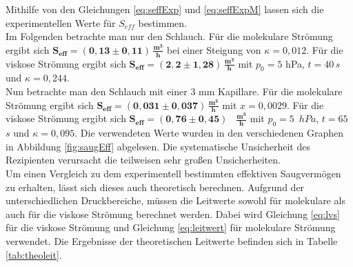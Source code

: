 \documentclass[a4paper,usenatbib]{aspdoc}
\begin{document}
            Mithilfe von den Gleichungen \ref{eq:seffExp} und \ref{eq:seffExpM} lassen sich die experimentellen Werte für $S_{eff}$ bestimmen. 
            \\
            Im Folgenden betrachte man nur den Schlauch. Für die molekulare Strömung ergibt sich $\mathbf{S_{eff} = (0,13 \pm 0,11)}$\,$\mathbf{ \frac{m^3}{h}}$ bei einer Steigung von $\kappa = 0,012$. Für die viskose Strömung ergibt sich $\mathbf{S_{eff} = (2,2 \pm 1,28)}$\,$\mathbf{ \frac{m^3}{h}}$ mit $p_0 = 5$ hPa, $t = 40$\,$s$ und $\kappa = 0,244$.\\
            Nun betrachte man den Schlauch mit einer 3 mm Kapillare. Für die molekulare Strömung ergibt sich $\mathbf{S_{eff} = (0,031 \pm 0,037)}$\,$\mathbf{\frac{m^3}{h}}$ mit $x = 0,0029$. Für die viskose Strömung ergibt sich $\mathbf{S_{eff} = (0,76 \pm 0,45)}$ \, $\mathbf{ \frac{m^3}{h}}$ mit $p_0 = 5$\, $hPa$, $t = 65$\,$s$ und $\kappa = 0,095$.
            Die verwendeten Werte wurden in den verschiedenen Graphen in Abbildung \ref{fig:saugEff} abgelesen. Die systematische Unsicherheit des Rezipienten verursacht die teilweisen sehr großen Unsicherheiten. 
            \\
            Um einen Vergleich zu dem experimentell bestimmten effektiven Saugvermögen zu erhalten, lässt sich dieses auch theoretisch berechnen. Aufgrund der unterschiedlichen Druckbereiche, müssen die Leitwerte sowohl für molekulare als auch für die viskose Strömung berechnet werden. Dabei wird Gleichung \ref{eq:lvs} für die viskose Strömung und Gleichung \ref{eq:leitwert} für molekulare Strömung verwendet. Die Ergebnisse der theoretischen Leitwerte befinden sich in Tabelle \ref{tab:theoleit}.
\end{document}

